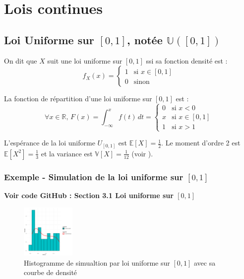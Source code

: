 \section{Lois continues}
    \subsection{Loi Uniforme sur $[0,1]$, notée $\mathbb{U}([0,1])$}
        On dit que $X$ suit une loi uniforme sur $[0,1]$ ssi sa fonction densité est : 
        \begin{equation}
            f_X(x) = \left\{
                \begin{array}{ll}
                    1 & \text{si } x \in [0,1] \\
                    0 & \text{sinon}
                \end{array}
            \right.
        \label{eq:loi_uniforme_01}
        \end{equation}

    La fonction de répartition d’une loi uniforme sur $[0,1]$ est :
    \begin{equation}
        \forall x\in\mathbb R,\, F(x)=\int_{-\infty}^x f(t)\,dt = \left\{
            \begin{array}{ll}
                0 & \text{si } x < 0 \\
                x & \text{si } x \in [0,1] \\
                1 & \text{si } x > 1
            \end{array}
        \right.
    \end{equation}

    L’espérance de la loi uniforme $U_{[0,1]}$ est $\mathbb{E}[X]=\frac{1}{2}$. Le moment d’ordre 2 est $\mathbb{E}[X^2]=\frac{1}{3}$ et la variance est $\mathbb{V}[X]=\frac{1}{12}$ (voir \cite{loi_uniforme}). 
    
    \subsubsection{Exemple - Simulation de la loi uniforme sur $[0,1]$}
        \textbf{Voir code GitHub \cite{git} : Section 3.1 Loi uniforme sur $[0,1]$}

        \begin{figure}[H]
            \centering
            \includegraphics[width=0.23\textwidth]{4_attachments/figures/output8.png}
            \caption{Histogramme de simualtion par loi uniforme sur $[0,1]$ avec sa courbe de densité}
            \label{fig:histogramme_uniforme_01}
        \end{figure}

